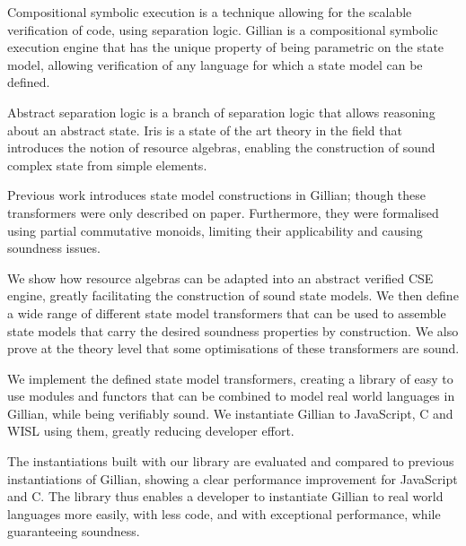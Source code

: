 Compositional symbolic execution is a technique allowing for the scalable verification of code, using separation logic. Gillian is a compositional symbolic execution engine that has the unique property of being parametric on the state model, allowing verification of any language for which a state model can be defined.

Abstract separation logic is a branch of separation logic that allows reasoning about an abstract state. Iris is a state of the art theory in the field that introduces the notion of resource algebras, enabling the construction of sound complex state from simple elements.

Previous work introduces state model constructions in Gillian; though these transformers were only described on paper. Furthermore, they were formalised using partial commutative monoids, limiting their applicability and causing soundness issues.

We show how resource algebras can be adapted into an abstract verified CSE engine, greatly facilitating the construction of sound state models. We then define a wide range of different state model transformers that can be used to assemble state models that carry the desired soundness properties by construction. We also prove at the theory level that some optimisations of these transformers are sound.

We implement the defined state model transformers, creating a library of easy to use modules and functors that can be combined to model real world languages in Gillian, while being verifiably sound. We instantiate Gillian to JavaScript, C and WISL using them, greatly reducing developer effort.

The instantiations built with our library are evaluated and compared to previous instantiations of Gillian, showing a clear performance improvement for JavaScript and C. The library thus enables a developer to instantiate Gillian to real world languages more easily, with less code, and with exceptional performance, while guaranteeing soundness.
